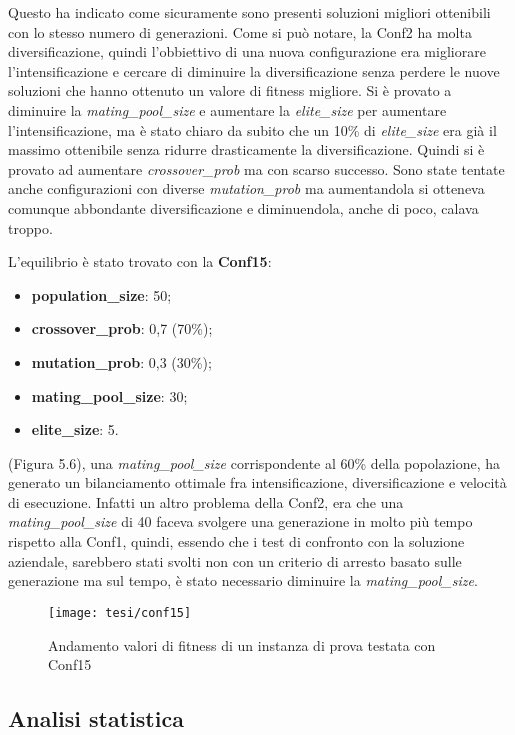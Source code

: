 Questo ha indicato come sicuramente sono presenti soluzioni migliori ottenibili con lo stesso numero di generazioni. Come si può notare, la Conf2 ha molta diversificazione, quindi l'obbiettivo di una nuova configurazione era migliorare l'intensificazione e cercare di diminuire la diversificazione senza perdere le nuove soluzioni che hanno ottenuto un valore di fitness migliore. Si è provato a diminuire la \emph{mating\_pool\_size} e aumentare la \emph{elite\_size} per aumentare l'intensificazione, ma è stato chiaro da subito che un 10\% di \emph{elite\_size} era già il massimo ottenibile senza ridurre drasticamente la diversificazione. Quindi si è provato ad aumentare \emph{crossover\_prob} ma con scarso successo. Sono state tentate anche configurazioni con diverse \emph{mutation\_prob} ma aumentandola si otteneva comunque abbondante diversificazione e diminuendola, anche di poco, calava troppo. 

\noindent L'equilibrio è stato trovato con la \textbf{Conf15}:
\begin{itemize}
	\item\textbf{population\_size}: 50;
	\item\textbf{crossover\_prob}: 0,7 (70\%);
	\item\textbf{mutation\_prob}: 0,3 (30\%);
	\item\textbf{mating\_pool\_size}: 30;
	\item\textbf{elite\_size}: 5.
\end{itemize}

(Figura 5.6), una \emph{mating\_pool\_size} corrispondente al 60\% della popolazione, ha generato un bilanciamento ottimale fra intensificazione, diversificazione e velocità di esecuzione. Infatti un altro problema della Conf2, era che una \emph{mating\_pool\_size} di 40 faceva svolgere una generazione in molto più tempo rispetto alla Conf1, quindi, essendo che i test di confronto con la soluzione aziendale, sarebbero stati svolti non con un criterio di arresto basato sulle generazione ma sul tempo, è stato necessario diminuire la \emph{mating\_pool\_size}.

\begin{figure}[!ht] 
    \centering 
    \texttt{[image: tesi/conf15]} 
    \caption{Andamento valori di fitness di un instanza di prova testata con Conf15}
\end{figure}

\subsection{Analisi statistica}

